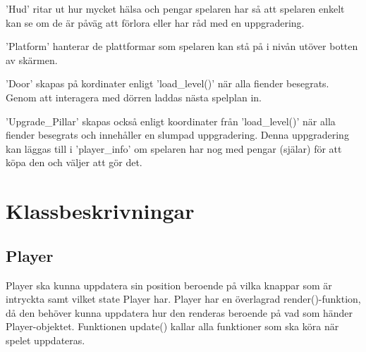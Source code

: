 \documentclass{TDP005mall}
\begin{document}
'Hud' ritar ut hur mycket hälsa och pengar spelaren har så att spelaren enkelt kan se om de är påväg att förlora eller har råd med en uppgradering. 

'Platform' hanterar de plattformar som spelaren kan stå på i nivån utöver botten av skärmen. 

'Door' skapas på kordinater enligt 'load\_level()' när alla fiender besegrats. Genom att interagera med dörren laddas nästa spelplan in. 

'Upgrade\_Pillar' skapas också enligt koordinater från 'load\_level()' när alla fiender besegrats och innehåller en slumpad uppgradering. Denna uppgradering kan läggas till i 'player\_info' om spelaren har nog med pengar (själar) för att köpa den och väljer att gör det.

\section{Klassbeskrivningar}
\subsection{Player}
Player ska kunna uppdatera sin position beroende på vilka knappar som är intryckta samt vilket state Player har.
Player har en överlagrad render()-funktion, då den behöver kunna uppdatera hur den renderas beroende på vad som händer Player-objektet.
Funktionen update() kallar alla funktioner som ska köra när spelet uppdateras. 
\end{document}
